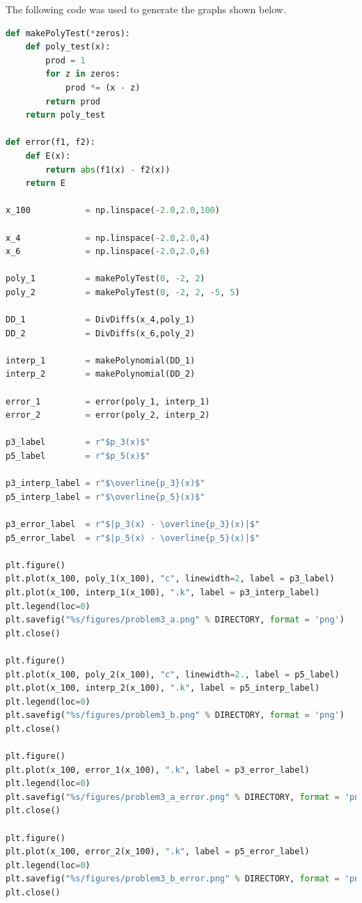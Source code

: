 \documentclass[12pt]{article}
\begin{document}
\noindent The following code was used to generate the graphs shown below.
\begin{lstlisting}[language=Python, caption=Problem 3]
def makePolyTest(*zeros):
    def poly_test(x):
        prod = 1
        for z in zeros:
            prod *= (x - z)
        return prod
    return poly_test

def error(f1, f2):
    def E(x):
        return abs(f1(x) - f2(x))
    return E

x_100           = np.linspace(-2.0,2.0,100)

x_4             = np.linspace(-2.0,2.0,4)
x_6             = np.linspace(-2.0,2.0,6)

poly_1          = makePolyTest(0, -2, 2)
poly_2          = makePolyTest(0, -2, 2, -5, 5)

DD_1            = DivDiffs(x_4,poly_1)
DD_2            = DivDiffs(x_6,poly_2)

interp_1        = makePolynomial(DD_1)
interp_2        = makePolynomial(DD_2)

error_1         = error(poly_1, interp_1)
error_2         = error(poly_2, interp_2)

p3_label        = r"$p_3(x)$"
p5_label        = r"$p_5(x)$"

p3_interp_label = r"$\overline{p_3}(x)$"
p5_interp_label = r"$\overline{p_5}(x)$"

p3_error_label  = r"$|p_3(x) - \overline{p_3}(x)|$"
p5_error_label  = r"$|p_5(x) - \overline{p_5}(x)|$"

plt.figure()
plt.plot(x_100, poly_1(x_100), "c", linewidth=2, label = p3_label)
plt.plot(x_100, interp_1(x_100), ".k", label = p3_interp_label)
plt.legend(loc=0)
plt.savefig("%s/figures/problem3_a.png" % DIRECTORY, format = 'png')
plt.close()

plt.figure()
plt.plot(x_100, poly_2(x_100), "c", linewidth=2., label = p5_label)
plt.plot(x_100, interp_2(x_100), ".k", label = p5_interp_label)
plt.legend(loc=0)
plt.savefig("%s/figures/problem3_b.png" % DIRECTORY, format = 'png')
plt.close()

plt.figure()
plt.plot(x_100, error_1(x_100), ".k", label = p3_error_label)
plt.legend(loc=0)
plt.savefig("%s/figures/problem3_a_error.png" % DIRECTORY, format = 'png')
plt.close()

plt.figure()
plt.plot(x_100, error_2(x_100), ".k", label = p5_error_label)
plt.legend(loc=0)
plt.savefig("%s/figures/problem3_b_error.png" % DIRECTORY, format = 'png')
plt.close()
\end{lstlisting}
\end{document}
